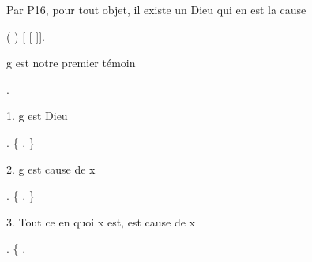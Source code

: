 \documentclass[10pt]{report}
\begin{document}
\begin{coqdoccode}
\begin{coqdoccomment}
\coqdocindent{0.50em}
Par\coqdocindent{0.50em}
P16,\coqdocindent{0.50em}
pour\coqdocindent{0.50em}
tout\coqdocindent{0.50em}
objet,\coqdocindent{0.50em}
il\coqdocindent{0.50em}
existe\coqdocindent{0.50em}
un\coqdocindent{0.50em}
Dieu\coqdocindent{0.50em}
qui\coqdocindent{0.50em}
en\coqdocindent{0.50em}
est\coqdocindent{0.50em}
la\coqdocindent{0.50em}
cause\coqdocindent{0.50em}
\end{coqdoccomment}
\coqdoceol
\coqdocindent{1.00em}
 ( )  [ [ ]].\coqdoceol
\coqdocemptyline
\coqdocindent{1.00em}
\begin{coqdoccomment}
\coqdocindent{0.50em}
g\coqdocindent{0.50em}
est\coqdocindent{0.50em}
notre\coqdocindent{0.50em}
premier\coqdocindent{0.50em}
témoin\coqdocindent{0.50em}
\end{coqdoccomment}
\coqdoceol
\coqdocindent{1.00em}
\coqdoctac{\ensuremath{\exists}} .\coqdoceol
\coqdocemptyline
\coqdocindent{1.00em}
\begin{coqdoccomment}
\coqdocindent{0.50em}
1.\coqdocindent{0.50em}
g\coqdocindent{0.50em}
est\coqdocindent{0.50em}
Dieu\coqdocindent{0.50em}
\end{coqdoccomment}
\coqdoceol
\coqdocindent{1.00em}
. \{  . \}\coqdoceol
\coqdocindent{1.00em}
\coqdoceol
\coqdocindent{1.00em}
\begin{coqdoccomment}
\coqdocindent{0.50em}
2.\coqdocindent{0.50em}
g\coqdocindent{0.50em}
est\coqdocindent{0.50em}
cause\coqdocindent{0.50em}
de\coqdocindent{0.50em}
x\coqdocindent{0.50em}
\end{coqdoccomment}
\coqdoceol
\coqdocindent{1.00em}
. \{  . \}\coqdoceol
\coqdocindent{1.00em}
\coqdoceol
\coqdocindent{1.00em}
\begin{coqdoccomment}
\coqdocindent{0.50em}
3.\coqdocindent{0.50em}
Tout\coqdocindent{0.50em}
ce\coqdocindent{0.50em}
en\coqdocindent{0.50em}
quoi\coqdocindent{0.50em}
x\coqdocindent{0.50em}
est,\coqdocindent{0.50em}
est\coqdocindent{0.50em}
cause\coqdocindent{0.50em}
de\coqdocindent{0.50em}
x\coqdocindent{0.50em}
\end{coqdoccomment}
\coqdoceol
\coqdocindent{1.00em}
.\coqdoceol
\coqdocindent{1.00em}
\{ \coqdoceol
\coqdocindent{2.00em}
  .\coqdoceol
\coqdocindent{2.00em}
\begin{coqdoccomment}

\end{coqdoccomment}
\end{coqdoccode}
\end{document}
